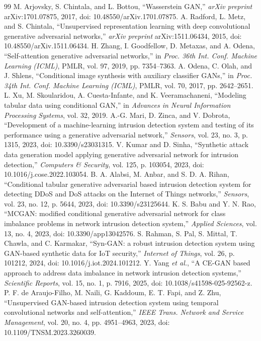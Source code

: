 \documentclass{iaesarticle}
\begin{document}
\begin{thebibliography}{99}
 M. Arjovsky, S. Chintala, and L. Bottou, ``Wasserstein GAN,'' \textsl{arXiv preprint} arXiv:1701.07875, 2017, doi: 10.48550/arXiv.1701.07875.
 A. Radford, L. Metz, and S. Chintala, ``Unsupervised representation learning with deep convolutional generative adversarial networks,'' \textsl{arXiv preprint} arXiv:1511.06434, 2015, doi: 10.48550/arXiv.1511.06434.
 H. Zhang, I. Goodfellow, D. Metaxas, and A. Odena, ``Self-attention generative adversarial networks,'' in \textsl{Proc. 36th Int. Conf. Machine Learning (ICML)}, PMLR, vol. 97, 2019, pp. 7354--7363.
 A. Odena, C. Olah, and J. Shlens, ``Conditional image synthesis with auxiliary classifier GANs,'' in \textsl{Proc. 34th Int. Conf. Machine Learning (ICML)}, PMLR, vol. 70, 2017, pp. 2642--2651.
 L. Xu, M. Skoularidou, A. Cuesta-Infante, and K. Veeramachaneni, ``Modeling tabular data using conditional GAN,'' in \textsl{Advances in Neural Information Processing Systems}, vol. 32, 2019.
 A.-G. Mari, D. Zinca, and V. Dobrota, ``Development of a machine-learning intrusion detection system and testing of its performance using a generative adversarial network,'' \textsl{Sensors}, vol. 23, no. 3, p. 1315, 2023, doi: 10.3390/s23031315.
 V. Kumar and D. Sinha, ``Synthetic attack data generation model applying generative adversarial network for intrusion detection,'' \textsl{Computers \& Security}, vol. 125, p. 103054, 2023, doi: 10.1016/j.cose.2022.103054.
 B. A. Alabsi, M. Anbar, and S. D. A. Rihan, ``Conditional tabular generative adversarial based intrusion detection system for detecting DDoS and DoS attacks on the Internet of Things networks,'' \textsl{Sensors}, vol. 23, no. 12, p. 5644, 2023, doi: 10.3390/s23125644.
 K. S. Babu and Y. N. Rao, ``MCGAN: modified conditional generative adversarial network for class imbalance problems in network intrusion detection system,'' \textsl{Applied Sciences}, vol. 13, no. 4, 2023, doi: 10.3390/app13042576.
 S. Rahman, S. Pal, S. Mittal, T. Chawla, and C. Karmakar, ``Syn-GAN: a robust intrusion detection system using GAN-based synthetic data for IoT security,'' \textsl{Internet of Things}, vol. 26, p. 101212, 2024, doi: 10.1016/j.iot.2024.101212.
 Y. Yang \textsl{et al.}, ``A CE-GAN based approach to address data imbalance in network intrusion detection systems,'' \textsl{Scientific Reports}, vol. 15, no. 1, p. 7916, 2025, doi: 10.1038/s41598-025-92562-z.
 P. F. de Araujo-Filho, M. Naili, G. Kaddoum, E. T. Fapi, and Z. Zhu, ``Unsupervised GAN-based intrusion detection system using temporal convolutional networks and self-attention,'' \textsl{IEEE Trans. Network and Service Management}, vol. 20, no. 4, pp. 4951--4963, 2023, doi: 10.1109/TNSM.2023.3260039.

\end{thebibliography}
\end{document}
